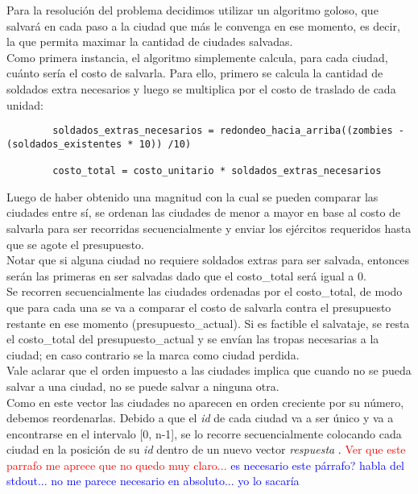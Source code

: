 Para la resoluci\'on del problema decidimos utilizar un algoritmo goloso, que salvar\'a en cada paso a la ciudad que m\'as le convenga en ese momento, es decir, la que permita maximar la cantidad de ciudades salvadas.\\

Como primera instancia, el algoritmo simplemente calcula, para cada ciudad, cu\'anto ser\'ia el costo de salvarla. Para ello, primero se calcula la cantidad de soldados extra necesarios y luego se multiplica por el costo de traslado de cada unidad:\\


	\begin{codesnippet}
	\begin{verbatim}
		soldados_extras_necesarios = redondeo_hacia_arriba((zombies - (soldados_existentes * 10)) /10)
		
		costo_total = costo_unitario * soldados_extras_necesarios
	\end{verbatim}
	\end{codesnippet}

Luego de haber obtenido una magnitud con la cual se pueden comparar las ciudades entre s\'i, se ordenan las ciudades de menor a mayor en base al costo de salvarla para ser recorridas secuencialmente y enviar los ej\'ercitos requeridos hasta que se agote el presupuesto.\\

Notar que si alguna ciudad no requiere soldados extras para ser salvada, entonces ser\'an las primeras en ser salvadas dado que el costo_total ser\'a igual a 0.\\
 
Se recorren secuencialmente las ciudades ordenadas por el costo_total, de modo que para cada una se va a comparar el costo de salvarla contra el presupuesto restante en ese momento (presupuesto_actual). Si es factible el salvataje, se resta el costo_total del presupuesto_actual y se env\'ian las tropas necesarias a la ciudad; en caso contrario se la marca como ciudad perdida.\\

Vale aclarar que el orden impuesto a las ciudades implica que cuando no se pueda salvar a una ciudad, no se puede salvar a ninguna otra.\\
 
Como en este vector las ciudades no aparecen en orden creciente por su n\'umero, debemos reordenarlas. Debido a que el \emph{id} de cada ciudad va a ser \'unico y va a encontrarse en el intervalo [0, n-1], se lo recorre secuencialmente colocando cada ciudad en la posici\'on de su \textit{id} dentro de un nuevo vector \emph{respuesta} . \textcolor{red}{Ver que este parrafo me aprece que no quedo muy claro...} \textcolor{blue}{es necesario este p\'arrafo? habla del stdout... no me parece necesario en absoluto... yo lo sacar\'ia}\\

